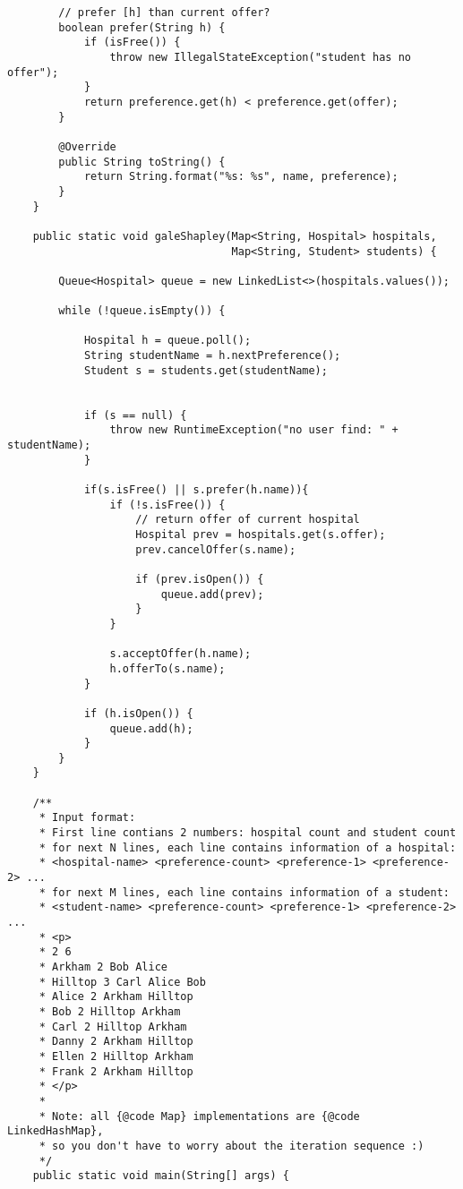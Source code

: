 \documentclass[14pt, a4paper]{article}
\begin{document}
\begin{verbatim}
        // prefer [h] than current offer?
        boolean prefer(String h) {
            if (isFree()) {
                throw new IllegalStateException("student has no offer");
            }
            return preference.get(h) < preference.get(offer);
        }

        @Override
        public String toString() {
            return String.format("%s: %s", name, preference);
        }
    }

    public static void galeShapley(Map<String, Hospital> hospitals,
                                   Map<String, Student> students) {

        Queue<Hospital> queue = new LinkedList<>(hospitals.values());

        while (!queue.isEmpty()) {

            Hospital h = queue.poll();
            String studentName = h.nextPreference();
            Student s = students.get(studentName);


            if (s == null) {
                throw new RuntimeException("no user find: " + studentName);
            }

            if(s.isFree() || s.prefer(h.name)){
                if (!s.isFree()) {
                    // return offer of current hospital
                    Hospital prev = hospitals.get(s.offer);
                    prev.cancelOffer(s.name);

                    if (prev.isOpen()) {
                        queue.add(prev);
                    }
                }

                s.acceptOffer(h.name);
                h.offerTo(s.name);
            }

            if (h.isOpen()) {
                queue.add(h);
            }
        }
    }

    /**
     * Input format:
     * First line contians 2 numbers: hospital count and student count
     * for next N lines, each line contains information of a hospital:
     * <hospital-name> <preference-count> <preference-1> <preference-2> ...
     * for next M lines, each line contains information of a student:
     * <student-name> <preference-count> <preference-1> <preference-2> ...
     * <p>
     * 2 6
     * Arkham 2 Bob Alice
     * Hilltop 3 Carl Alice Bob
     * Alice 2 Arkham Hilltop
     * Bob 2 Hilltop Arkham
     * Carl 2 Hilltop Arkham
     * Danny 2 Arkham Hilltop
     * Ellen 2 Hilltop Arkham
     * Frank 2 Arkham Hilltop
     * </p>
     *
     * Note: all {@code Map} implementations are {@code LinkedHashMap},
     * so you don't have to worry about the iteration sequence :)
     */
    public static void main(String[] args) {


\end{verbatim}
\end{document}
